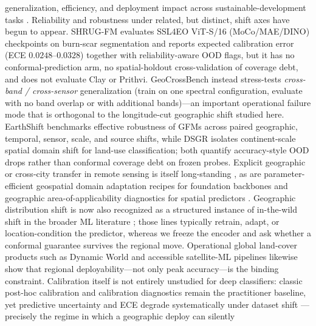 \documentclass[preprint,11pt,authoryear]{elsarticle}
\begin{document}
generalization, efficiency, and deployment impact across sustainable-development tasks
\citep{ghamisi2025sustainfm}. Reliability and robustness under related, but distinct, shift axes have
begun to appear. SHRUG-FM \citep{cohrs2025shrugfm} evaluates SSL4EO ViT-S/16 (MoCo/MAE/DINO) checkpoints on
burn-scar segmentation and reports expected calibration error (ECE $0.0248$--$0.0328$) together with
reliability-aware OOD flags, but it has no conformal-prediction arm, no spatial-holdout cross-validation
of coverage debt, and does not evaluate Clay or Prithvi. GeoCrossBench \citep{tamazyan2025geocrossbench}
instead stress-tests \emph{cross-band / cross-sensor} generalization (train on one spectral configuration,
evaluate with no band overlap or with additional bands)---an important operational failure mode that is
orthogonal to the longitude-cut geographic shift studied here. EarthShift \citep{doerksen2026earthshift}
benchmarks effective robustness of GFMs across paired geographic, temporal, sensor, scale, and source
shifts, while DSGR \citep{alemadi2025dsgr} isolates continent-scale spatial domain shift for land-use
classification; both quantify accuracy-style OOD drops rather than conformal coverage debt on frozen probes.
Explicit geographic or cross-city transfer in remote sensing is itself long-standing
\citep{tuia2016domain,zhu2017deep,hong2023crosscity}, as are parameter-efficient geospatial domain
adaptation recipes for foundation backbones \citep{scheibenreif2024domainadapt} and geographic
area-of-applicability diagnostics for spatial predictors \citep{meyer2021aoa}. Geographic distribution
shift is now also recognized as a structured instance of in-the-wild shift in the broader ML literature
\citep{koh2021wilds,crasto2025geoshift,christie2018fmow}; those lines typically retrain, adapt, or
location-condition the predictor, whereas we freeze the encoder and ask whether a conformal guarantee
survives the regional move. Operational global land-cover products such as Dynamic World
\citep{brown2022dynamicworld} and accessible satellite-ML pipelines \citep{rolf2021mosaiks,jean2016combining}
likewise show that regional deployability---not only peak accuracy---is the binding constraint.
Calibration itself is not entirely unstudied for deep classifiers: classic post-hoc calibration
\citep{guo2017calibration} and calibration diagnostics
\citep{nixon2019measuring,mukhoti2020calibrating,kumar2019verified,minderer2021revisiting}
remain the practitioner baseline, yet predictive uncertainty and ECE degrade systematically under dataset
shift \citep{ovadia2019uncertainty}---precisely the regime in which a geographic deploy can silently
\end{document}
